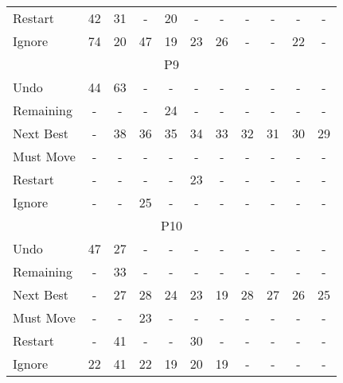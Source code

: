 \begin{table}[tpb]
{\begin{tabular}{|l|cccccccccc|}
Restart & 42 & 31 & - & 20 & - & - & - & - & - & - \\ \cline{1-1}
Ignore & 74 & 20 & 47 & 19 & 23 & 26 & - & - & 22 & - \\ \hline
\multicolumn{11}{|c|}{P9} \\ \hline
Undo & 44 & 63 & - & - & - & - & - & - & - & - \\ \cline{1-1}
Remaining & - & - & - & 24 & - & - & - & - & - & - \\ \cline{1-1}
Next Best & - & 38 & 36 & 35 & 34 & 33 & 32 & 31 & 30 & 29 \\ \cline{1-1}
Must Move & - & - & - & - & - & - & - & - & - & - \\ \cline{1-1}
Restart & - & - & - & - & 23 & - & - & - & - & - \\ \cline{1-1}
Ignore & - & - & 25 & - & - & - & - & - & - & - \\ \hline
\multicolumn{11}{|c|}{P10} \\ \hline
Undo & 47 & 27 & - & - & - & - & - & - & - & - \\ \cline{1-1}
Remaining & - & 33 & - & - & - & - & - & - & - & - \\ \cline{1-1}
Next Best & - & 27 & 28 & 24 & 23 & 19 & 28 & 27 & 26 & 25 \\ \cline{1-1}
Must Move & - & - & 23 & - & - & - & - & - & - & - \\ \cline{1-1}
Restart & - & 41 & - & - & 30 & - & - & - & - & - \\ \cline{1-1}
Ignore & 22 & 41 & 22 & 19 & 20 & 19 & - & - & - & - \\ \hline
\end{tabular}%
}
\end{table}

